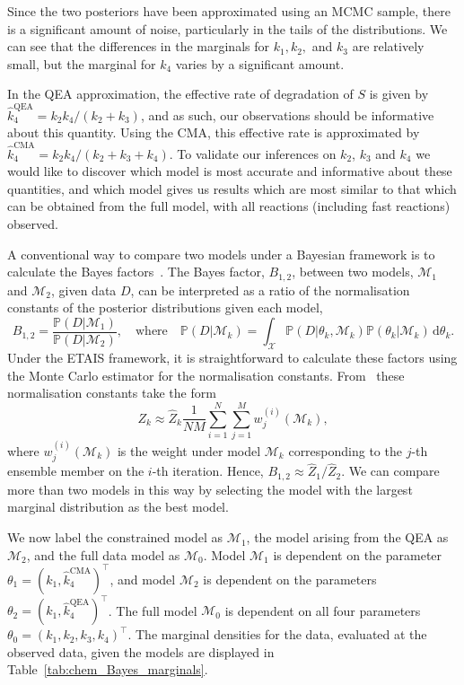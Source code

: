 \documentclass[final]{siamltex}
\begin{document}
Since the two posteriors have been approximated using an MCMC sample,
there is a significant amount of noise, particularly in the tails of
the distributions. We can see that the differences in the marginals
for $k_1, k_2,$ and $k_3$ are relatively small, but the marginal for
$k_4$ varies by a significant amount. 

In the QEA approximation, the effective rate of degradation of $S$ is
given by $\hat{k}_4^{\text{QEA}} = k_2k_4/(k_2+k_3)$, and as such, our
observations should be informative about this quantity. Using the CMA,
this effective rate is approximated by $\hat{k}_4^{\text{CMA}} =
k_2k_4/(k_2+k_3+k_4)$. To validate our inferences on $k_2$, $k_3$ and
$k_4$ we would like to discover which model is most accurate and
informative about these quantities, and which model gives us results
which are most similar to that which can be obtained from the full
model, with all reactions (including fast reactions) observed.

A conventional way to compare two models under a Bayesian framework is
to calculate the Bayes factors~\cite{chen2012monte}. The Bayes factor,
$B_{1,2}$, between two models, $\mathcal{M}_1$ and $\mathcal{M}_2$,
given data $D$, can be interpreted as a ratio of the normalisation constants of the posterior distributions given each model,
\[
	B_{1,2} = \frac{\mathbb{P}(D|\mathcal{M}_1)}{\mathbb{P}(D|\mathcal{M}_2)}, \quad \text{where} \quad \mathbb{P}(D|\mathcal{M}_k) = \int_\mathcal{X} \mathbb{P}(D|\theta_k,\mathcal{M}_k)\mathbb{P}(\theta_k|\mathcal{M}_k) \, \text{d}\theta_k.
\]
Under the ETAIS framework, it is straightforward to calculate these factors using the Monte Carlo estimator for the normalisation constants. From~\cite{robert2013monte} these normalisation constants take the form
\[
	Z_k \approx \hat{Z}_k\frac{1}{NM}\sum_{i=1}^N\sum_{j=1}^M w_j^{(i)}(\mathcal{M}_k),
\]
where $w_j^{(i)}(\mathcal{M}_k)$ is the weight under model $\mathcal{M}_k$ corresponding to the $j$-th ensemble member on the $i$-th iteration. Hence, $B_{1,2} \approx \hat{Z}_1/\hat{Z}_2$. We can compare more than two models in this way by selecting the model with the largest marginal distribution as the best model.

We now label the constrained model as $\mathcal{M}_1$, the model
arising from the QEA as $\mathcal{M}_2$, and the full data model as
$\mathcal{M}_0$. Model $\mathcal{M}_1$ is dependent on the parameter
$\theta_1 = (k_1, \hat{k}_4^{\text{CMA}})^\top$, and model
$\mathcal{M}_2$ is dependent on the parameters $\theta_2 = (k_1,
\hat{k}_4^{\text{QEA}})^\top$. The full model $\mathcal{M}_0$ is
dependent on all four parameters $\theta_0 = (k_1, k_2, k_3, k_4)^\top$. The marginal densities for the data, evaluated at the observed data, given the models are displayed in Table~\ref{tab:chem_Bayes_marginals}.
\end{document}
